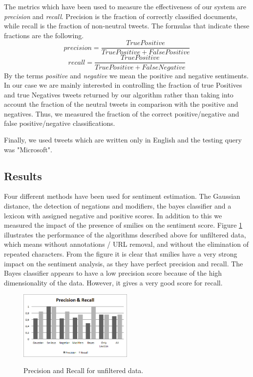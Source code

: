 The metrics which have been used to measure the effectiveness of our system are \emph{precision} and \emph{recall}.
Precision is the fraction of correctly classified documents, while recall is the fraction of non-neutral tweets. The formulas that indicate these fractions are the following.
\begin{equation}
precision = \frac{TruePositive}{TruePositive + FalsePositive }
\end{equation}
\begin{equation}
recall = \frac{TruePositive}{TruePositive + FalseNegative}
\end{equation}
By the terms \emph{positive} and \emph{negative} we mean the positive and negative sentiments. In our case we are mainly interested in controlling the fraction of true Positives and true Negatives tweets returned by our algorithm rather than taking into account the fraction of  the neutral tweets in comparison with the positive and negatives. Thus, we measured the fraction of the correct positive/negative and false positive/negative classifications.

Finally, we used tweets which are written only in English and the testing query was "Microsoft". 


\subsection{Results}
Four different methods have been used for sentiment estimation. The Gaussian distance, the detection of negations and modifiers, the bayes classifier and a lexicon with assigned negative and positive scores. In addition to this we measured the impact of the presence of smilies on the sentiment score. Figure \ref{unfiltereddata} illustrates the performance of the algorithms described above for unfiltered data, which means without annotations / URL removal, and without the elimination of repeated characters. From the figure it is clear that smilies have a very strong impact on the sentiment analysis, as they have perfect precision and recall. The Bayes classifier appears to have a low precision score because of the high dimensionality of the data. However, it gives a very good score for recall.
\begin{figure}[ht]
\centering
\includegraphics[width=0.5\textwidth]{images/unfiltereddata.png}
\label{unfiltereddata}
\caption{Precision and Recall for unfiltered data.}
\end{figure}

